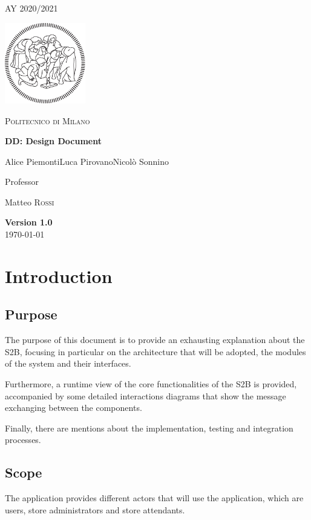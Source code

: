 \documentclass[table, 12pt]{article}
\begin{document}
\begin{titlepage}
    \centering
    {\scshape\large AY 2020/2021 \par}
    \vfill
    \includegraphics[width=100pt]{assets/logo-polimi-new}\par\vspace{1cm}
    {\scshape\LARGE Politecnico di Milano \par}
    \vspace{1.5cm}
    {\huge\bfseries DD\@: Design Document \par}
    \vspace{2cm}
    {\Large {Alice Piemonti\quad Luca Pirovano\quad Nicolò Sonnino}\par}
    \vfill
    {\large Professor\par
        Matteo \textsc{Rossi}}
    \vfill
    {\large \textbf{Version 1.0} \\ \today \par}
\end{titlepage}
\thispagestyle{plain}
\mbox{}
\newpage
{}
\tableofcontents
\newpage
{}

\section{Introduction}
\subsection{Purpose}
The purpose of this document is to provide an exhausting explanation about the S2B, focusing in particular on the architecture that will be adopted, the modules of the system and their interfaces.

Furthermore, a runtime view of the core functionalities of the S2B is provided, accompanied by some detailed interactions diagrams that show the message exchanging between the components.

Finally, there are mentions about the implementation, testing and integration processes.

\subsection{Scope}
The application provides different actors that will use the application, which are users, store administrators and store attendants.
\end{document}

